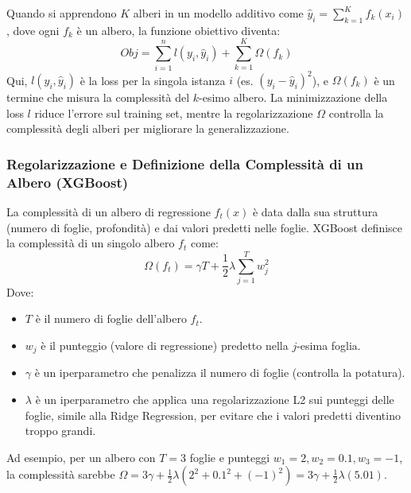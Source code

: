 \documentclass{article}
\begin{document}
Quando si apprendono $K$ alberi in un modello additivo come $\hat{y}_i = \sum_{k=1}^{K} f_k(x_i)$, dove ogni $f_k$ è un albero, la funzione obiettivo diventa:
$$ Obj = \sum_{i=1}^{n} l(y_i, \hat{y}_i) + \sum_{k=1}^{K} \Omega(f_k) $$
Qui, $l(y_i, \hat{y}_i)$ è la loss per la singola istanza $i$ (es. $(y_i - \hat{y}_i)^2$), e $\Omega(f_k)$ è un termine che misura la complessità del $k$-esimo albero. La minimizzazione della loss $l$ riduce l'errore sul training set, mentre la regolarizzazione $\Omega$ controlla la complessità degli alberi per migliorare la generalizzazione.

\subsubsection{Regolarizzazione e Definizione della Complessità di un Albero (XGBoost)}
La complessità di un albero di regressione $f_t(x)$ è data dalla sua struttura (numero di foglie, profondità) e dai valori predetti nelle foglie. XGBoost definisce la complessità di un singolo albero $f_t$ come:
$$ \Omega(f_t) = \gamma T + \frac{1}{2} \lambda \sum_{j=1}^{T} w_j^2 $$
Dove:
\begin{itemize}
    \item $T$ è il numero di foglie dell'albero $f_t$.
    \item $w_j$ è il punteggio (valore di regressione) predetto nella $j$-esima foglia.
    \item $\gamma$ è un iperparametro che penalizza il numero di foglie (controlla la potatura).
    \item $\lambda$ è un iperparametro che applica una regolarizzazione L2 sui punteggi delle foglie, simile alla Ridge Regression, per evitare che i valori predetti diventino troppo grandi.
\end{itemize}
Ad esempio, per un albero con $T=3$ foglie e punteggi $w_1=2, w_2=0.1, w_3=-1$, la complessità sarebbe $\Omega = 3\gamma + \frac{1}{2}\lambda(2^2 + 0.1^2 + (-1)^2) = 3\gamma + \frac{1}{2}\lambda(5.01)$.
\end{document}
